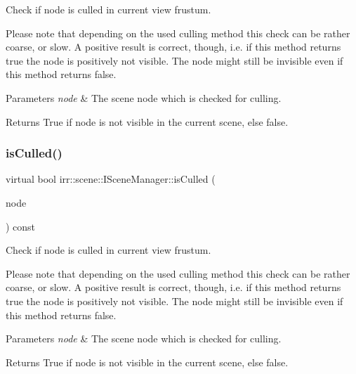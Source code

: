 Check if node is culled in current view frustum. 

Please note that depending on the used culling method this check can be rather coarse, or slow. A positive result is correct, though, i.\+e. if this method returns true the node is positively not visible. The node might still be invisible even if this method returns false. 
\begin{DoxyParams}{Parameters}
{\em node} & The scene node which is checked for culling. \\
\hline
\end{DoxyParams}
\begin{DoxyReturn}{Returns}
True if node is not visible in the current scene, else false. 
\end{DoxyReturn}
\mbox{\label{classirr_1_1scene_1_1ISceneManager_aff6c6d553e0faf12bbfd33e814ad4352}} 
\subsubsection{\texorpdfstring{is\+Culled()}{isCulled()}\hspace{0.1cm}{\footnotesize\ttfamily [2/2]}}
{\footnotesize\ttfamily virtual bool irr\+::scene\+::\+I\+Scene\+Manager\+::is\+Culled (\begin{DoxyParamCaption}\item[{const \hyperlink{classirr_1_1scene_1_1ISceneNode}{I\+Scene\+Node} $\ast$}]{node }\end{DoxyParamCaption}) const\hspace{0.3cm}{\ttfamily [pure virtual]}}



Check if node is culled in current view frustum. 

Please note that depending on the used culling method this check can be rather coarse, or slow. A positive result is correct, though, i.\+e. if this method returns true the node is positively not visible. The node might still be invisible even if this method returns false. 
\begin{DoxyParams}{Parameters}
{\em node} & The scene node which is checked for culling. \\
\hline
\end{DoxyParams}
\begin{DoxyReturn}{Returns}
True if node is not visible in the current scene, else false. 
\end{DoxyReturn}
\mbox{\label{classirr_1_1scene_1_1ISceneManager_aa7641dd33e84fca7946ed17047349a3e}} 
